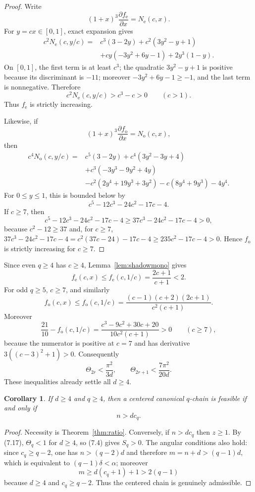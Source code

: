 \documentclass[11pt]{article}
\newtheorem{corollary}[theorem]{Corollary}
\theoremstyle{remark}
\begin{document}
\begin{proof}
Write
\[
(1+x)^3\frac{\partial f_{\mathrm e}}{\partial x}=N_{\mathrm e}(c,x).
\]
For \(y=cx\in[0,1]\), exact expansion gives
\[
\begin{aligned}
c^2N_{\mathrm e}(c,y/c)
={}&c^3(3-2y)+c^2(3y^2-y+1)\\
&+cy(-3y^2+6y-1)+2y^3(1-y).
\end{aligned}
\tag{7.14}
\]
On \([0,1]\), the first term is at least \(c^3\); the quadratic \(3y^2-y+1\) is positive because its discriminant is \(-11\); moreover \(-3y^2+6y-1\ge-1\), and the last term is nonnegative.  Therefore
\[
c^2N_{\mathrm e}(c,y/c)>c^3-c>0
\qquad(c>1).
\]
Thus \(f_{\mathrm e}\) is strictly increasing.

Likewise, if
\[
(1+x)^3\frac{\partial f_{\mathrm o}}{\partial x}=N_{\mathrm o}(c,x),
\]
then
\[
\begin{aligned}
c^4N_{\mathrm o}(c,y/c)
={}&c^5(3-2y)+c^4(3y^2-3y+4)\\
&+c^3(-3y^3-9y^2+4y)\\
&-c^2(2y^4+19y^3+3y^2)-c(8y^4+9y^3)-4y^4.
\end{aligned}
\tag{7.15}
\]
For \(0\le y\le1\), this is bounded below by
\[
c^5-12c^3-24c^2-17c-4.
\]
If \(c\ge7\), then
\[
c^5-12c^3-24c^2-17c-4
\ge37c^3-24c^2-17c-4>0,
\]
because \(c^2-12\ge37\) and, for \(c\ge7\), \(37c^3-24c^2-17c-4=c^2(37c-24)-17c-4\ge235c^2-17c-4>0\).
Hence \(f_{\mathrm o}\) is strictly increasing for \(c\ge7\).
\end{proof}

Since even \(q\ge4\) has \(c\ge4\), Lemma~\ref{lem:shadowmono} gives
\[
f_{\mathrm e}(c,x)\le f_{\mathrm e}(c,1/c)
=\frac{2c+1}{c+1}<2.
\tag{7.16}
\]
For odd \(q\ge5\), \(c\ge7\), and similarly
\[
f_{\mathrm o}(c,x)\le f_{\mathrm o}(c,1/c)
=\frac{(c-1)(c+2)(2c+1)}{c^2(c+1)}.
\]
Moreover
\[
\frac{21}{10}-f_{\mathrm o}(c,1/c)
=\frac{c^3-9c^2+30c+20}{10c^2(c+1)}>0
\qquad(c\ge7),
\]
because the numerator is positive at \(c=7\) and has derivative
\(3((c-3)^2+1)>0\).  Consequently
\[
\boxed{\Theta_{2r}<\frac{\pi^2}{3d},\qquad
\Theta_{2r+1}<\frac{7\pi^2}{20d}.}
\tag{7.17}
\]
These inequalities already settle all \(d\ge4\).

\begin{corollary}\label{cor:dge4}
If $d\ge4$ and $q\ge4$, then a centered canonical $q$-chain is feasible if and only if
\[
 n>dc_q.
\]
\end{corollary}

\begin{proof}
Necessity is Theorem~\ref{thm:ratio}. Conversely, if $n>dc_q$ then $z\ge1$. By (7.17), $\Theta_q<1$ for $d\ge4$, so (7.4) gives $S_q>0$.  The angular conditions also hold: since $c_q\ge q-2$, one has $n>(q-2)d$ and therefore $m=n+d>(q-1)d$, which is equivalent to $(q-1)\delta<\alpha$; moreover
\[
m\ge d(c_q+1)+1>2(q-1)
\]
because $d\ge4$ and $c_q\ge q-2$.  Thus the centered chain is genuinely admissible.
\end{proof}
\end{document}
